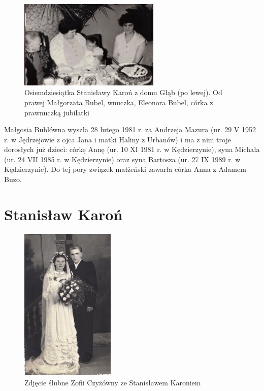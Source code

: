\begin{figure}[!h]
\begin{center}
\includegraphics[width=0.6\textwidth]{zdjecia/stanislawa_karon_eleonora_i_malgorzata_bublowie.jpg}
\caption[Osiemdziesiątka Stanisławy Karoń - cztery pokolenia]{Osiemdziesiątka Stanisławy Karoń z domu Głąb (po lewej). Od prawej Małgorzata Bubel, wnuczka, Eleonora Bubel, córka z prawnuczką jubilatki}
\label{rys:stanislawa_karon_eleonora_i_malgorzata_bublowie}
\end{center}
\end{figure}

Małgosia Bublówna wyszła 28 lutego 1981 r. za Andrzeja Mazura (ur. 29 V 1952 r. w Jędrzejowie z ojca Jana i matki Haliny z Urbanów) i ma z nim troje dorosłych już dzieci: córkę Annę (ur. 10 XI 1981 r. w Kędzierzynie), syna Michała (ur. 24 VII 1985 r. w Kędzierzynie) oraz syna Bartosza (ur. 27 IX 1989 r. w Kędzierzynie). Do tej pory związek małżeński zawarła córka Anna z Adamem Buzo.

\section{Stanisław Karoń}

\begin{figure}[!b]
\begin{center}
\includegraphics[width=0.4\textwidth]{zdjecia/slub_stanislawa_i_zofii_karon.jpg}
\caption{Zdjęcie ślubne Zofii Czyżówny ze Stanisławem Karoniem}
\label{rys:slub_stanislawa_i_zofii_karon}
\end{center}
\end{figure}

